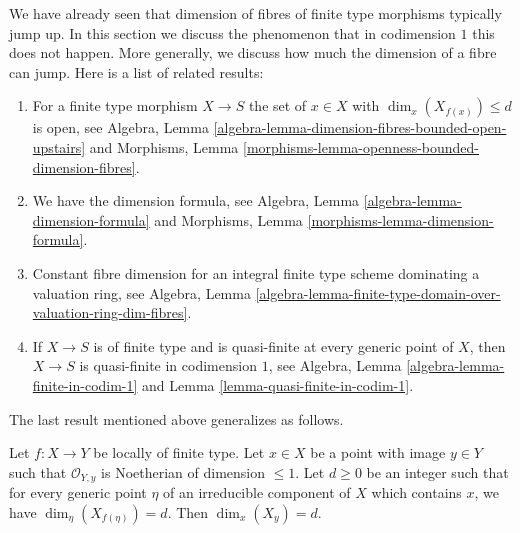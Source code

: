 \noindent
We have already seen that dimension of fibres of finite type morphisms
typically jump up. In this section we discuss the phenomenon that in
codimension $1$ this does not happen. More generally, we discuss how
much the dimension of a fibre can jump. Here is a list of related results:
\begin{enumerate}
\item For a finite type morphism $X \to S$ the set of
$x \in X$ with $\dim_x(X_{f(x)}) \leq d$ is open, see
Algebra, Lemma \ref{algebra-lemma-dimension-fibres-bounded-open-upstairs}
and
Morphisms, Lemma \ref{morphisms-lemma-openness-bounded-dimension-fibres}.
\item We have the dimension formula, see
Algebra, Lemma \ref{algebra-lemma-dimension-formula} and
Morphisms, Lemma \ref{morphisms-lemma-dimension-formula}.
\item Constant fibre dimension for an integral finite type scheme
dominating a valuation ring, see Algebra, Lemma
\ref{algebra-lemma-finite-type-domain-over-valuation-ring-dim-fibres}.
\item If $X \to S$ is of finite type and is quasi-finite at every
generic point of $X$, then $X \to S$ is quasi-finite in codimension $1$, see
Algebra, Lemma \ref{algebra-lemma-finite-in-codim-1} and
Lemma \ref{lemma-quasi-finite-in-codim-1}.
\end{enumerate}
The last result mentioned above generalizes as follows.

\begin{lemma}
\label{lemma-dimension-fibre-in-codim-1}
Let $f : X \to Y$ be locally of finite type. Let $x \in X$ be a point
with image $y \in Y$ such that $\mathcal{O}_{Y, y}$ is Noetherian of
dimension $\leq 1$. Let $d \geq 0$ be an integer such that for every
generic point $\eta$ of an irreducible component of $X$ which contains
$x$, we have $\dim_\eta(X_{f(\eta)}) = d$. Then $\dim_x(X_y) = d$.
\end{lemma}

